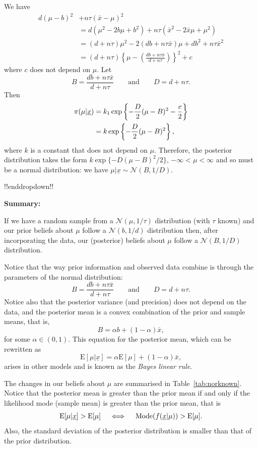 {    

    
        We have
\begin{align*}
d(\mu-b)^2&+n\tau(\bar x-\mu)^2\\
&=d(\mu^2-2b\mu+b^2)+n\tau(\bar x^2-2\bar x\mu+\mu^2)\\
&=(d+n\tau)\mu^2-2(db+n\tau\bar x)\mu
+db^2+n\tau\bar x^2\\
&=(d+n\tau)\left\{\mu
-\left(\frac{db+n\tau\bar x}{d+n\tau}\right)\right\}^2+c
\end{align*}
where $c$ does not depend on $\mu$.  Let
\begin{equation}
\label{eq:p12}
B=\frac{db+n\tau\bar x}{d+n\tau}\quad\quad\text{and}\quad\quad
D=d+n\tau.
\end{equation}
Then
\begin{align}
\label{eq:p13}
\pi(\mu|\underline{x})&=k_1\exp\left\{-\frac{D}{2}(\mu-B)^2-\frac{c}{2}\right\}
\notag \\
&=k\exp\left\{-\frac{D}{2}(\mu-B)^2\right\},
\end{align}
where $k$ is a constant that does not depend on $\mu$. Therefore, the posterior distribution takes the form $k\exp\{-D(\mu-B)^2/2\}$, $-\infty<\mu<\infty$ and so must be a normal distribution: we have $\mu|\underline{x}\sim \mathcal{N}(B,1/D)$.

!!enddropdown!!


\textbf{Summary:}

If we have a random sample from a $\mathcal{N}(\mu,1/\tau)$ distribution (with $\tau$ known) and our prior beliefs about $\mu$ follow a $\mathcal{N}(b,1/d)$ distribution then, after incorporating the data, our (posterior) beliefs about $\mu$ follow a $\mathcal{N}(B,1/D)$ distribution.

Notice that the way prior information and observed data combine is through the parameters of the normal distribution:
\begin{equation*}
B = \frac{db+n\tau\bar x}{d+n\tau}
\quad\quad\text{and}\quad\quad 
D = d+n\tau.
\end{equation*}
Notice also that the posterior variance (and precision) does not depend on the data, and the posterior mean is a convex combination of the prior and sample means, that is,
$$
B=\alpha b+(1-\alpha)\bar x,
$$
for some $\alpha\in(0,1)$. This equation for the posterior mean, which can be rewritten as
$$
\text{E}[\mu|\underline{x}]=\alpha \text{E}[\mu]+(1-\alpha)\bar x,
$$
arises in other models and is known as the \textit{Bayes linear rule}.

The changes in our beliefs about $\mu$ are summarised in Table~\ref{tab:norknown}.  Notice that the posterior mean is greater than the prior mean if and only if the likelihood mode (sample mean) is greater than the prior mean, that is
\begin{equation*}
\text{E}[\mu|\underline{x}] > \text{E}[\mu] \quad\iff\quad \textnormal{Mode}(f(\underline{x}|\mu))>\text{E}[\mu].
\end{equation*}
Also, the standard deviation of the posterior distribution is smaller than that of the prior distribution.

}
